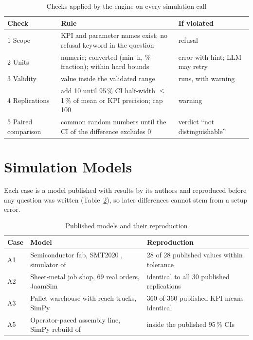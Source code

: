 \documentclass[conference]{IEEEtran}
\begin{document}
\begin{table}[t]
\caption{Checks applied by the engine on every simulation call}
\label{tab:checks}
\centering\small
\begin{tabular}{@{}p{}p{}p{}@{}}
\toprule
Check & Rule & If violated \\
\midrule
1 Scope & KPI and parameter names exist; no refusal keyword in the question & refusal \\
2 Units & numeric; converted (min--h, \%--fraction); within hard bounds & error with hint; LLM may retry \\
3 Validity & value inside the validated range & runs, with warning \\
4 Replications & add 10 until 95\,\% CI half-width $\le$ 1\,\% of mean or KPI precision; cap 100 & warning \\
5 Paired comparison & common random numbers until the CI of the difference excludes 0 & verdict ``not distinguishable'' \\
\bottomrule
\end{tabular}
\end{table}

\section{Simulation Models}
Each case is a model published with results by its authors and reproduced before any question was written (Table~\ref{tab:cases}), so later differences cannot stem from a setup error.

\begin{table}[t]
\caption{Published models and their reproduction}
\label{tab:cases}
\centering\small
\begin{tabular}{@{}p{}p{}p{}@{}}
\toprule
Case & Model & Reproduction \\
\midrule
A1 & Semiconductor fab, SMT2020 \cite{kopp2020}, simulator of \cite{tassel2023} & 28 of 28 published values within tolerance \\
A2 & Sheet-metal job shop, 69 real orders, JaamSim \cite{jurczyk2026} & identical to all 30 published replications \\
A3 & Pallet warehouse with reach trucks, SimPy \cite{saengphueng2026} & 360 of 360 published KPI means identical \\
A5 & Operator-paced assembly line, SimPy rebuild of \cite{seppanen2005} & inside the published 95\,\% CIs \\
\bottomrule
\end{tabular}
\end{table}
\end{document}
